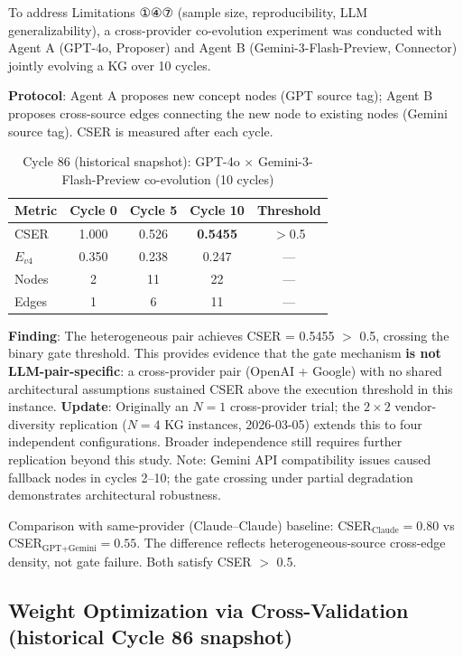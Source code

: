 \documentclass[12pt]{article}
\begin{document}
To address Limitations ①④⑦ (sample size, reproducibility, LLM generalizability),
a cross-provider co-evolution experiment was conducted with Agent A (GPT-4o, Proposer)
and Agent B (Gemini-3-Flash-Preview, Connector) jointly evolving a KG over 10 cycles.

\textbf{Protocol}: Agent A proposes new concept nodes (GPT source tag);
Agent B proposes cross-source edges connecting the new node to existing nodes
(Gemini source tag). CSER is measured after each cycle.

\begin{table}[h!]\centering\small
\begin{tabular}{lcccc}
\toprule
Metric & Cycle 0 & Cycle 5 & Cycle 10 & Threshold \\
\midrule
CSER & 1.000 & 0.526 & \textbf{0.5455} & $>$0.5 \\
$E_{v4}$ & 0.350 & 0.238 & 0.247 & --- \\
Nodes & 2 & 11 & 22 & --- \\
Edges & 1 & 6 & 11 & --- \\
\bottomrule
\end{tabular}
\caption{Cycle 86 (historical snapshot): GPT-4o $\times$ Gemini-3-Flash-Preview co-evolution (10 cycles)}
\end{table}

\textbf{Finding}: The heterogeneous pair achieves CSER = 0.5455 $>$ 0.5, crossing
the binary gate threshold. This provides evidence that the gate mechanism
\textbf{is not LLM-pair-specific}: a cross-provider pair (OpenAI + Google) with no
shared architectural assumptions sustained CSER above the execution threshold in this instance.
\textbf{Update}: Originally an $N=1$ cross-provider trial; the $2\times2$ vendor-diversity replication ($N=4$ KG instances, 2026-03-05) extends this to four independent configurations. Broader independence still requires further replication beyond this study.
Note: Gemini API compatibility issues caused fallback nodes in cycles 2--10;
the gate crossing under partial degradation demonstrates architectural robustness.

Comparison with same-provider (Claude--Claude) baseline:
CSER$_{\text{Claude}}=0.80$ vs CSER$_{\text{GPT+Gemini}}=0.55$. The difference reflects
heterogeneous-source cross-edge density, not gate failure. Both satisfy CSER $>$ 0.5.

\subsection{Weight Optimization via Cross-Validation (historical Cycle 86 snapshot)}
\end{document}
